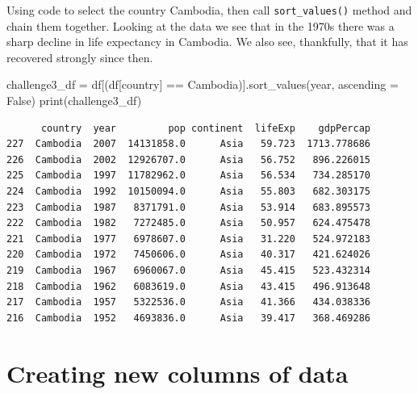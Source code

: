 \documentclass[
  letterpaper,
  DIV=11,
  numbers=noendperiod]{scrreprt}
\newenvironment{Shaded}{\begin{snugshade}}{\end{snugshade}}
\newcommand{\BuiltInTok}[1]{\textcolor[rgb]{0.00,0.23,0.31}{#1}}
\newcommand{\NormalTok}[1]{\textcolor[rgb]{0.00,0.23,0.31}{#1}}
\newcommand{\OperatorTok}[1]{\textcolor[rgb]{0.37,0.37,0.37}{#1}}
\newcommand{\StringTok}[1]{\textcolor[rgb]{0.13,0.47,0.30}{#1}}
\newcommand{\VariableTok}[1]{\textcolor[rgb]{0.07,0.07,0.07}{#1}}
\begin{document}
\begin{tcolorbox}[enhanced jigsaw, colframe=quarto-callout-note-color-frame, toprule=.15mm, colback=white, leftrule=.75mm, rightrule=.15mm, breakable, colbacktitle=quarto-callout-note-color!10!white, arc=.35mm, bottomtitle=1mm, bottomrule=.15mm, titlerule=0mm, title={Solution to Challenge 3}, toptitle=1mm, left=2mm, opacityback=0, coltitle=black, opacitybacktitle=0.6]

Using code to select the country Cambodia, then call
\texttt{sort\_values()} method and chain them together. Looking at the
data we see that in the 1970s there was a sharp decline in life
expectancy in Cambodia. We also see, thankfully, that it has recovered
strongly since then.

\begin{Shaded}
\begin{Highlighting}[]
\NormalTok{challenge3\_df }\OperatorTok{=}\NormalTok{ df[(df[}\StringTok{\textquotesingle{}country\textquotesingle{}}\NormalTok{] }\OperatorTok{==} \StringTok{\textquotesingle{}Cambodia\textquotesingle{}}\NormalTok{)].sort\_values(}\StringTok{\textquotesingle{}year\textquotesingle{}}\NormalTok{, ascending }\OperatorTok{=} \VariableTok{False}\NormalTok{)}
\BuiltInTok{print}\NormalTok{(challenge3\_df)}
\end{Highlighting}
\end{Shaded}

\begin{verbatim}
      country  year         pop continent  lifeExp    gdpPercap
227  Cambodia  2007  14131858.0      Asia   59.723  1713.778686
226  Cambodia  2002  12926707.0      Asia   56.752   896.226015
225  Cambodia  1997  11782962.0      Asia   56.534   734.285170
224  Cambodia  1992  10150094.0      Asia   55.803   682.303175
223  Cambodia  1987   8371791.0      Asia   53.914   683.895573
222  Cambodia  1982   7272485.0      Asia   50.957   624.475478
221  Cambodia  1977   6978607.0      Asia   31.220   524.972183
220  Cambodia  1972   7450606.0      Asia   40.317   421.624026
219  Cambodia  1967   6960067.0      Asia   45.415   523.432314
218  Cambodia  1962   6083619.0      Asia   43.415   496.913648
217  Cambodia  1957   5322536.0      Asia   41.366   434.038336
216  Cambodia  1952   4693836.0      Asia   39.417   368.469286
\end{verbatim}

\end{tcolorbox}

\hypertarget{creating-new-columns-of-data}{%
\section{Creating new columns of
data}\label{creating-new-columns-of-data}}
\end{document}
